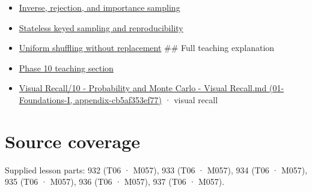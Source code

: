\begin{itemize}
\item
  \hyperref[appendix-8d863ed954d0]{Inverse, rejection, and importance sampling}
\item
  \hyperref[appendix-daaf25bfd3a0]{Stateless keyed sampling and reproducibility}
\item
  \hyperref[appendix-184fcc411663]{Uniform shuffling without replacement} \#\# Full teaching explanation
\item
  \href{Continuous\%20Notes/Computing\%20Foundations\%20-\%20From\%20Bits\%20to\%20C++\%20and\%20Systems\%20APIs\#6.\%20A\%20computer\%20produces\%20deterministic\%20pseudorandom\%20sequences}{Phase 10 teaching section}
\item
  \href{../01-Foundations-I/main.pdf\#nameddest=appendix-cb5af353ef77}{Visual Recall/10 - Probability and Monte Carlo - Visual Recall.md (01-Foundations-I, appendix-cb5af353ef77)} · visual recall
\end{itemize}

\section{Source coverage}\label{appendix-e0f7c7e08f3a-source-coverage}

Supplied lesson parts: 932 (T06 · M057), 933 (T06 · M057), 934 (T06 · M057), 935 (T06 · M057), 936 (T06 · M057), 937 (T06 · M057).
